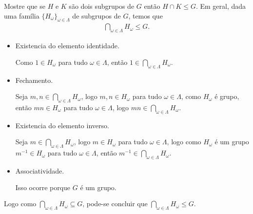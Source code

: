 \begin{homeworkProblem}
  Mostre que se $H$ e $K$ são dois subgrupos de $G$ então $H \cap K \leq G$.
  Em geral, dada uma família $\{H_\omega\}_{\omega\in\Lambda}$ de subgrupos de $G$, temos que
  \begin{align*}
    \bigcap_{\omega\in\Lambda} H_\omega \leq G .
  \end{align*}
  \begin{solution}
    \begin{itemize}
      \item Existencia do elemento identidade.

        Como $1\in H_\omega$ para tudo $\omega\in\Lambda$, então $1\in \bigcap_{\omega\in\Lambda} H_\omega$. 
      \item Fechamento.

        Seja $m,n\in \bigcap_{\omega\in\Lambda} H_\omega$, logo $m,n\in H_\omega$ para tudo $\omega\in\Lambda$, como $H_\omega$ é grupo, então $mn\in H_\omega$ para tudo $\omega\in\Lambda$, logo $mn\in\bigcap_{\omega\in\Lambda} H_\omega$. 
      \item Existencia do elemento inverso.

        Seja $m\in\bigcap_{\omega\in\Lambda} H_\omega$, logo $m\in H_\omega$ para tudo $\omega\in\Lambda$, logo como $H_\omega$ é um grupo $m^{-1}\in H_\omega$ para tudo $\omega\in\Lambda$, então $m^{-1}\in \bigcap_{\omega\in\Lambda} H_\omega$. 
      \item Associatividade.

        Isso ocorre porque $G$ é um grupo.
    \end{itemize}
    Logo como $\bigcap_{\omega\in\Lambda} H_\omega\subseteq G$, pode-se concluir que $\bigcap_{\omega\in\Lambda} H_\omega\leq G$. 
  \end{solution}
\end{homeworkProblem}

